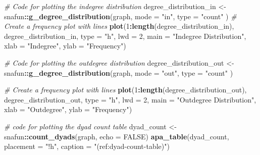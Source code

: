 \documentclass[
  man,floatsintext]{apa6}
\newenvironment{Shaded}{\begin{snugshade}}{\end{snugshade}}
\newcommand{\AttributeTok}[1]{\textcolor[rgb]{0.13,0.29,0.53}{#1}}
\newcommand{\CommentTok}[1]{\textcolor[rgb]{0.56,0.35,0.01}{\textit{#1}}}
\newcommand{\ConstantTok}[1]{\textcolor[rgb]{0.56,0.35,0.01}{#1}}
\newcommand{\DecValTok}[1]{\textcolor[rgb]{0.00,0.00,0.81}{#1}}
\newcommand{\FunctionTok}[1]{\textcolor[rgb]{0.13,0.29,0.53}{\textbf{#1}}}
\newcommand{\NormalTok}[1]{#1}
\newcommand{\OtherTok}[1]{\textcolor[rgb]{0.56,0.35,0.01}{#1}}
\newcommand{\SpecialCharTok}[1]{\textcolor[rgb]{0.81,0.36,0.00}{\textbf{#1}}}
\newcommand{\StringTok}[1]{\textcolor[rgb]{0.31,0.60,0.02}{#1}}
\begin{document}
\begin{Shaded}
\begin{Highlighting}[]
\CommentTok{\# Code for plotting the indegree distribution}
\NormalTok{degree\_distribution\_in }\OtherTok{\textless{}{-}}\NormalTok{ snafun}\SpecialCharTok{::}\FunctionTok{g\_degree\_distribution}\NormalTok{(graph, }
                                                        \AttributeTok{mode =} \StringTok{"in"}\NormalTok{, }
                                                        \AttributeTok{type =} \StringTok{"count"}
\NormalTok{                                                        )}
\CommentTok{\# Create a frequency plot with lines}
\FunctionTok{plot}\NormalTok{(}\DecValTok{1}\SpecialCharTok{:}\FunctionTok{length}\NormalTok{(degree\_distribution\_in), degree\_distribution\_in, }\AttributeTok{type =} \StringTok{"h"}\NormalTok{, }
     \AttributeTok{lwd =} \DecValTok{2}\NormalTok{, }\AttributeTok{main =} \StringTok{"Indegree Distribution"}\NormalTok{,}
     \AttributeTok{xlab =} \StringTok{"Indegree"}\NormalTok{, }\AttributeTok{ylab =} \StringTok{"Frequency"}\NormalTok{)}
\end{Highlighting}
\end{Shaded}

\begin{Shaded}
\begin{Highlighting}[]
\CommentTok{\# Code for plotting the outdegree distribution}
\NormalTok{degree\_distribution\_out }\OtherTok{\textless{}{-}}\NormalTok{ snafun}\SpecialCharTok{::}\FunctionTok{g\_degree\_distribution}\NormalTok{(graph, }
                                                         \AttributeTok{mode =} \StringTok{"out"}\NormalTok{, }
                                                         \AttributeTok{type =} \StringTok{"count"}
\NormalTok{                                                         )}

\CommentTok{\# Create a frequency plot with lines}
\FunctionTok{plot}\NormalTok{(}\DecValTok{1}\SpecialCharTok{:}\FunctionTok{length}\NormalTok{(degree\_distribution\_out), degree\_distribution\_out, }\AttributeTok{type =} \StringTok{"h"}\NormalTok{, }
     \AttributeTok{lwd =} \DecValTok{2}\NormalTok{, }\AttributeTok{main =} \StringTok{"Outdegree Distribution"}\NormalTok{, }
     \AttributeTok{xlab =} \StringTok{"Outdegree"}\NormalTok{, }\AttributeTok{ylab =} \StringTok{"Frequency"}\NormalTok{)}
\end{Highlighting}
\end{Shaded}

\begin{Shaded}
\begin{Highlighting}[]
\CommentTok{\# code for plotting the dyad count table}
\NormalTok{dyad\_count }\OtherTok{\textless{}{-}}\NormalTok{ snafun}\SpecialCharTok{::}\FunctionTok{count\_dyads}\NormalTok{(graph, }\AttributeTok{echo =} \ConstantTok{FALSE}\NormalTok{)}
\FunctionTok{apa\_table}\NormalTok{(dyad\_count,}
          \AttributeTok{placement =} \StringTok{"!h"}\NormalTok{,}
          \AttributeTok{caption =} \StringTok{"(ref:dyad{-}count{-}table)"}\NormalTok{)}
\end{Highlighting}
\end{Shaded}
\end{document}
